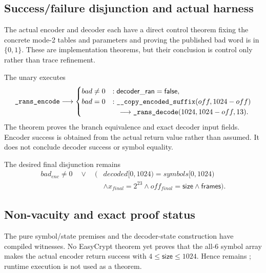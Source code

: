 \subsection*{Success/failure disjunction and actual harness}

The actual encoder and decoder each have a direct control theorem fixing the
concrete mode-2 tables and parameters and proving the published bad word is in
$\{0,1\}$. These are implementation theorems, but their conclusion is control
only rather than trace refinement.

The unary  executes
\[
\procname{_rans_encode}
\longrightarrow
\begin{cases}
  bad\neq0 &: \mathsf{decoder\_ran}=\mathsf{false},\\
  bad=0 &: \procname{__copy_encoded_suffix}(off,1024-off)\\
        &\quad\longrightarrow
          \procname{_rans_decode}(1024,1024-off,13).
\end{cases}
\]
The theorem  proves the
branch equivalence and exact decoder input fields. Encoder success is obtained
from the actual return value rather than assumed. It does not conclude decoder
success or symbol equality.

The desired final disjunction remains
\[
\begin{aligned}
  bad_{enc}\neq0\quad\lor\quad\bigl(&
    decoded[0,1024)=symbols[0,1024)\\
    &\land x_{final}=2^{23}
     \land off_{final}=\mathsf{size}
     \land \mathsf{frames}\bigr).
\end{aligned}
\]

\subsection*{Non-vacuity and exact proof status}

The pure symbol/state premises and the decoder-state construction have
compiled witnesses. No EasyCrypt theorem yet proves that the all-6 symbol
array makes the actual encoder return success with
$4\leq\mathsf{size}\leq1024$. Hence
 remains ; runtime
execution is not used as a theorem.

